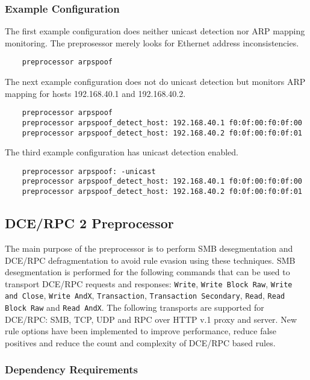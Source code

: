 \documentclass[english]{report}
\begin{document}
\subsubsection{Example Configuration}

The first example configuration does neither unicast detection nor ARP mapping
monitoring. The preprosessor merely looks for Ethernet address inconsistencies.

\begin{verbatim}
    preprocessor arpspoof
\end{verbatim}

The next example configuration does not do unicast detection but monitors ARP
mapping for hosts 192.168.40.1 and 192.168.40.2.

\begin{verbatim}
    preprocessor arpspoof
    preprocessor arpspoof_detect_host: 192.168.40.1 f0:0f:00:f0:0f:00
    preprocessor arpspoof_detect_host: 192.168.40.2 f0:0f:00:f0:0f:01
\end{verbatim}

The third example configuration has unicast detection enabled.

\begin{verbatim}
    preprocessor arpspoof: -unicast
    preprocessor arpspoof_detect_host: 192.168.40.1 f0:0f:00:f0:0f:00
    preprocessor arpspoof_detect_host: 192.168.40.2 f0:0f:00:f0:0f:01
\end{verbatim}

\subsection{DCE/RPC 2 Preprocessor}
\label{sub:dcerpc2}

The main purpose of the preprocessor is to perform SMB desegmentation and
DCE/RPC defragmentation to avoid rule evasion using these techniques.  SMB
desegmentation is performed for the following commands that can be used to
transport DCE/RPC requests and responses: \texttt{Write}, \texttt{Write Block
Raw}, \texttt{Write and Close}, \texttt{Write AndX}, \texttt{Transaction},
\texttt{Transaction Secondary}, \texttt{Read}, \texttt{Read Block Raw} and
\texttt{Read AndX}.  The following transports are supported for DCE/RPC: SMB,
TCP, UDP and RPC over HTTP v.1 proxy and server.  New rule options have been
implemented to improve performance, reduce false positives and reduce the count
and complexity of DCE/RPC based rules.

\subsubsection{Dependency Requirements}
\end{document}
